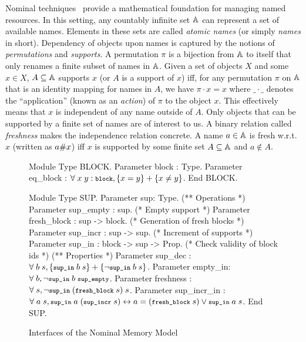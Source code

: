 Nominal techniques~\cite{pitts-nominal,gabby2002} provide a
mathematical foundation for managing named resources. 
%
In this setting, any countably infinite set $\mathbb{A}$ can
represent a set of available names. Elements in these sets are called
\emph{atomic names} (or simply \emph{names} in short). Dependency of
objects upon names is captured by the notions of \emph{permutations}
and \emph{supports}. A permutation $\pi$ is a bijection from
$\mathbb{A}$ to itself that only renames a finite subset of names in
$\mathbb{A}$. Given a set of objects $X$ and some $x \in X$, $A
\subseteq \mathbb{A}$ supports $x$ (or $A$ is a support of $x$) iff,
for any permutation $\pi$ on $\mathbb{A}$ that is an identity mapping
for names in $A$, we have $\pi \cdot x = x$ where $\_ \cdot \_$
denotes the ``application'' (known as an \emph{action}) of $\pi$ to the
object $x$. This effectively means that $x$ is independent of any name
outside of $A$.
%
Only objects that can be supported by a finite set of names are of
interest to us.
%
A binary relation called \emph{freshness} makes the independence
relation concrete. A name $a\in \mathbb{A}$ is fresh w.r.t. $x$
(written as $a \# x$) iff $x$ is supported by some finite set $A
\subseteq \mathbb{A}$ and $a \not\in A$.

\begin{figure}[t]
\begin{coq}
  Module Type BLOCK.
    Parameter block : Type.
    Parameter eq_block : $\forall\; x\; y: \texttt{\footnotesize block}, \{x=y\} + \{x \neq y\}$.
  End BLOCK.

  Module Type SUP.
    Parameter sup: Type.
    (** Operations *)
    Parameter sup_empty : sup.  (* Empty support *)
    Parameter fresh_block : sup -> block.  (* Generation of fresh blocks *)
    Parameter sup_incr : sup -> sup.  (* Increment of supports *)
    Parameter sup_in : block -> sup -> Prop.   (* Check validity of block ids *)
    (** Properties *)
    Parameter sup_dec : $\forall\; b\; s, \{\texttt{\footnotesize sup\_in}\; b\; s\} + \{\neg \texttt{\footnotesize sup\_in}\; b\; s\}$.
    Parameter empty_in: $\forall\; b, \neg \texttt{\footnotesize sup\_in}\; b\; \texttt{\footnotesize sup\_empty}$.
    Parameter freshness : $\forall\; s, \neg \texttt{\footnotesize sup\_in}\; (\texttt{\footnotesize fresh\_block}\; s)\; s$.
    Parameter sup_incr_in : $\forall\; a\; s, \texttt{\footnotesize sup\_in}\; a\; (\texttt{\footnotesize sup\_incr}\; s) 
    \leftrightarrow a = (\texttt{\footnotesize fresh\_block}\; s) \lor \texttt{\footnotesize sup\_in}\; a\; s$.
  End SUP.  
\end{coq}
  \caption{Interfaces of the Nominal Memory Model}
  \label{fig:nm-interface}
\end{figure}

